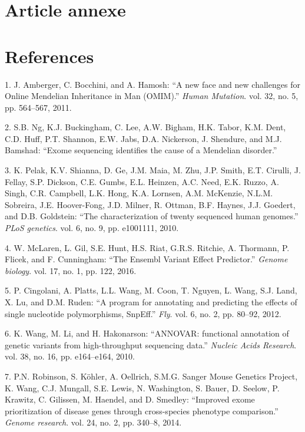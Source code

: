 \documentclass[12pt,a4paper,twoside]{ugathesis}
\begin{document}
\hypertarget{dnah12014}{\chapter{Article annexe}\label{dnah12014}}

\chapter*{References}\label{references}

\hypertarget{refs}{}
\hypertarget{ref-Amberger2011}{}
1. J. Amberger, C. Bocchini, and A. Hamosh: ``A new face and new
challenges for Online Mendelian Inheritance in Man (OMIM).'' \emph{Human
Mutation}. vol. 32, no. 5, pp. 564--567, 2011.

\hypertarget{ref-Ng}{}
2. S.B. Ng, K.J. Buckingham, C. Lee, A.W. Bigham, H.K. Tabor, K.M. Dent,
C.D. Huff, P.T. Shannon, E.W. Jabs, D.A. Nickerson, J. Shendure, and
M.J. Bamshad: ``Exome sequencing identifies the cause of a Mendelian
disorder.''

\hypertarget{ref-Pelak2010}{}
3. K. Pelak, K.V. Shianna, D. Ge, J.M. Maia, M. Zhu, J.P. Smith, E.T.
Cirulli, J. Fellay, S.P. Dickson, C.E. Gumbs, E.L. Heinzen, A.C. Need,
E.K. Ruzzo, A. Singh, C.R. Campbell, L.K. Hong, K.A. Lornsen, A.M.
McKenzie, N.L.M. Sobreira, J.E. Hoover-Fong, J.D. Milner, R. Ottman,
B.F. Haynes, J.J. Goedert, and D.B. Goldstein: ``The characterization of
twenty sequenced human genomes.'' \emph{PLoS genetics}. vol. 6, no. 9,
pp. e1001111, 2010.

\hypertarget{ref-McLaren2016}{}
4. W. McLaren, L. Gil, S.E. Hunt, H.S. Riat, G.R.S. Ritchie, A.
Thormann, P. Flicek, and F. Cunningham: ``The Ensembl Variant Effect
Predictor.'' \emph{Genome biology}. vol. 17, no. 1, pp. 122, 2016.

\hypertarget{ref-Cingolani2012}{}
5. P. Cingolani, A. Platts, L.L. Wang, M. Coon, T. Nguyen, L. Wang, S.J.
Land, X. Lu, and D.M. Ruden: ``A program for annotating and predicting
the effects of single nucleotide polymorphisms, SnpEff.'' \emph{Fly}.
vol. 6, no. 2, pp. 80--92, 2012.

\hypertarget{ref-Wang2010}{}
6. K. Wang, M. Li, and H. Hakonarson: ``ANNOVAR: functional annotation
of genetic variants from high-throughput sequencing data.''
\emph{Nucleic Acids Research}. vol. 38, no. 16, pp. e164--e164, 2010.

\hypertarget{ref-Robinson2014}{}
7. P.N. Robinson, S. Köhler, A. Oellrich, S.M.G. Sanger Mouse Genetics
Project, K. Wang, C.J. Mungall, S.E. Lewis, N. Washington, S. Bauer, D.
Seelow, P. Krawitz, C. Gilissen, M. Haendel, and D. Smedley: ``Improved
exome prioritization of disease genes through cross-species phenotype
comparison.'' \emph{Genome research}. vol. 24, no. 2, pp. 340--8, 2014.
\end{document}
